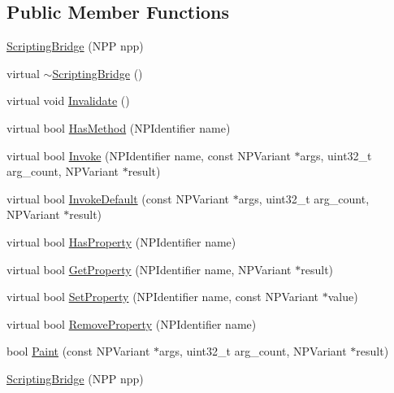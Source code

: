 \subsection*{Public Member Functions}
\begin{DoxyCompactItemize}
\item 
\hyperlink{classpi__generator_1_1_scripting_bridge_abcc778b6a4c482dff1ed271d7e776e42}{ScriptingBridge} (NPP npp)
\item 
virtual \hyperlink{classpi__generator_1_1_scripting_bridge_ae6c311b5f9ffa0a578c7d8e41fa9c23c}{$\sim$ScriptingBridge} ()
\item 
virtual void \hyperlink{classpi__generator_1_1_scripting_bridge_af00ea5a26438b33f976734a3432dfa9b}{Invalidate} ()
\item 
virtual bool \hyperlink{classpi__generator_1_1_scripting_bridge_a1d614bb3696baef7c46332426ab7a0dc}{HasMethod} (NPIdentifier name)
\item 
virtual bool \hyperlink{classpi__generator_1_1_scripting_bridge_ad18d2af321b2cba1235876cf281295df}{Invoke} (NPIdentifier name, const NPVariant $\ast$args, uint32\_\-t arg\_\-count, NPVariant $\ast$result)
\item 
virtual bool \hyperlink{classpi__generator_1_1_scripting_bridge_a2cee828951db15b4cce1074e934c4f97}{InvokeDefault} (const NPVariant $\ast$args, uint32\_\-t arg\_\-count, NPVariant $\ast$result)
\item 
virtual bool \hyperlink{classpi__generator_1_1_scripting_bridge_aeed261c756896802f26632acfceba1d7}{HasProperty} (NPIdentifier name)
\item 
virtual bool \hyperlink{classpi__generator_1_1_scripting_bridge_afef889fc2ff5ccabefb713cf7ad5e056}{GetProperty} (NPIdentifier name, NPVariant $\ast$result)
\item 
virtual bool \hyperlink{classpi__generator_1_1_scripting_bridge_ae73ff0ec0f70dfcd0e22534c8281f3e3}{SetProperty} (NPIdentifier name, const NPVariant $\ast$value)
\item 
virtual bool \hyperlink{classpi__generator_1_1_scripting_bridge_a861437163b8291eb7b302ce8f778022d}{RemoveProperty} (NPIdentifier name)
\item 
bool \hyperlink{classpi__generator_1_1_scripting_bridge_abfdee6fdc6c4f0cc6007425a14e8384e}{Paint} (const NPVariant $\ast$args, uint32\_\-t arg\_\-count, NPVariant $\ast$result)
\item 
\hyperlink{classpi__generator_1_1_scripting_bridge_abcc778b6a4c482dff1ed271d7e776e42}{ScriptingBridge} (NPP npp)
\item 

\end{DoxyCompactItemize}
